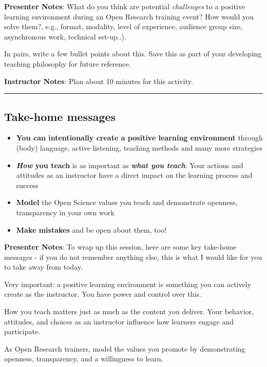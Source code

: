 \documentclass[
  letterpaper,
  DIV=11,
  numbers=noendperiod]{scrartcl}
\begin{document}
\textbf{Presenter Notes}: What do you think are potential
\emph{challenges} to a positive learning environment during an Open
Research training event? How would you solve them?, e.g., format,
modality, level of experience, audience group size, asynchronous work,
technical set-up..).

In pairs, write a few bullet points about this. Save this as part of
your developing teaching philosophy for future reference.

\textbf{Instructor Notes}: Plan about 10 minutes for this activity.

\begin{center}\rule{0.5\linewidth}{0.5pt}\end{center}

\subsection{Take-home messages}\label{take-home-messages}

\begin{itemize}
\item
  \textbf{You can intentionally create a positive learning environment}
  through (body) language, active listening, teaching methods and many
  more strategies
\item
  \textbf{\emph{How} you teach} is as important as \textbf{\emph{what
  you teach}}: Your actions and attitudes as an instructor have a direct
  impact on the learning process and success
\item
  \textbf{Model} the Open Science values you teach and demonstrate
  openness, transparency in your own work
\item
  \textbf{Make mistakes} and be open about them, too!
\end{itemize}

\textbf{Presenter Notes}: To wrap up this session, here are some key
take-home messages - if you do not remember anything else, this is what
I would like for you to take away from today.

Very important: a positive learning environment is something you can
actively create as the instructor. You have power and control over this.

How you teach matters just as much as the content you deliver. Your
behavior, attitudes, and choices as an instructor influence how learners
engage and participate.

As Open Research trainers, model the values you promote by demonstrating
openness, transparency, and a willingness to learn.
\end{document}
